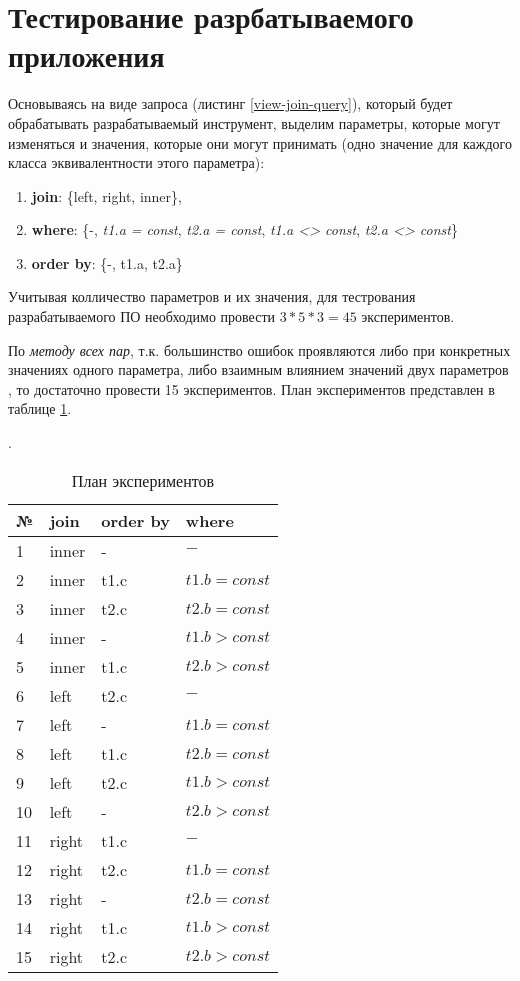 

\section{Тестирование разрбатываемого приложения}

Основываясь на виде запроса (листинг \ref{view-join-query}), который будет обрабатывать разрабатываемый инструмент, выделим параметры, которые могут изменяться и значения, которые они могут принимать (одно значение для каждого класса эквивалентности этого параметра):

\begin{enumerate}
\item \textbf{join}: \{left, right, inner\},
\item \textbf{where}: \{-, \textit{t1.a = const}, \textit{t2.a = const}, \textit{t1.a <> const}, \textit{t2.a <> const}\}
\item \textbf{order by}: \{-, t1.a, t2.a\}
\end{enumerate}

Учитывая колличество параметров и их значения, для тестрования разрабатываемого ПО необходимо провести $3 * 5 * 3 = 45$ экспериментов.

По \textit{методу всех пар}, т.к. большинство ошибок проявляются либо при конкретных значениях одного параметра, либо взаимным влиянием значений двух параметров \cite{article:Telcordia}, то достаточно провести 15 экспериментов. План экспериментов представлен в таблице \ref{table:list_experiments}.

\begin{table}[h]
\caption{План экспериментов}\label{table:list_experiments}.
\medskip
\begin{tabular}{|l|l|l|l|}
\hline
№ & join & order by & where\\
\hline
1 & inner & - & $-$\\\hline
2 & inner & t1.c & $t1.b = const$\\\hline
3 & inner & t2.c & $t2.b = const$\\\hline
4 & inner & - & $t1.b > const$\\\hline
5 & inner & t1.c & $t2.b > const$\\\hline
6 & left & t2.c & $-$\\\hline
7 & left & - & $t1.b = const$\\\hline
8 & left & t1.c & $t2.b = const$\\\hline
9 & left & t2.c & $t1.b > const$\\\hline
10 & left & - & $t2.b > const$\\\hline
11 & right & t1.c & $-$\\\hline
12 & right & t2.c & $t1.b = const$\\\hline
13 & right & - & $t2.b = const$\\\hline
14 & right & t1.c & $t1.b > const$\\\hline
15 & right & t2.c & $t2.b > const$\\\hline
\end{tabular}
\end{table}
